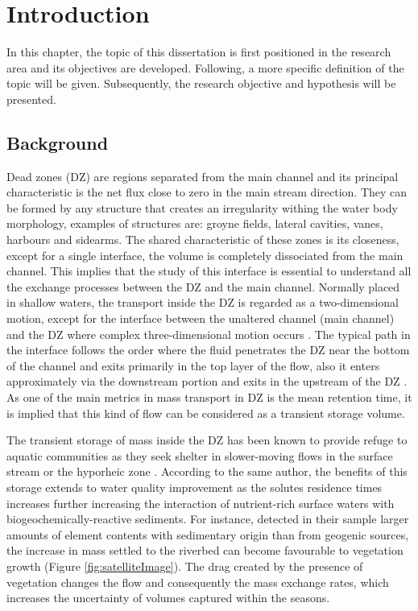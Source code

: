 \chapter{Introduction}
\label{chap:introduction}
In this chapter, the topic of this dissertation is first positioned in the research area and its objectives are developed. Following, a more specific definition of the topic will be given. Subsequently, the research objective and hypothesis will be presented.
\section{Background}
Dead zones (DZ) are regions separated from the main channel and its principal characteristic is the net flux close to zero in the main stream direction. They can be formed by any structure that creates an irregularity withing the water body morphology, examples of structures are: groyne fields, lateral cavities, vanes, harbours and sidearms. The shared characteristic of these zones is its closeness, except for a single interface, the volume is completely dissociated from the main channel. This implies that the study of this interface is essential to understand all the exchange processes between the DZ and the main channel. Normally placed in shallow waters, the transport inside the DZ is regarded as a two-dimensional motion, except for the interface between the unaltered channel (main channel) and the DZ where complex three-dimensional motion occurs \cite{xiang2020}. The typical path in the interface follows the order where the fluid penetrates the DZ near the bottom of the channel and exits primarily in the top layer of the flow, also it enters approximately via the downstream portion and exits in the upstream of the DZ \cite{weitbrecht2004,xiang2020}. As one of the main metrics in mass transport in DZ is the mean retention time, it is implied that this kind of flow can be considered as a transient storage volume.

The transient storage of mass inside the DZ has been known to provide refuge to aquatic communities as they seek shelter in slower-moving flows in the surface stream or the hyporheic zone \cite{jackson2013}. According to the same author, the benefits of this storage extends to water quality improvement as the solutes residence times increases further increasing the interaction of nutrient-rich surface waters with biogeochemically-reactive sediments. For instance, \textcite{SchwartzKozerski2003} detected in their sample larger amounts of element contents with sedimentary origin than from geogenic sources, the increase in mass settled to the riverbed can become favourable to vegetation growth (Figure \ref{fig:satelliteImage}). The drag created by the presence of vegetation changes the flow and consequently the mass exchange rates, which increases the uncertainty of volumes captured within the seasons.

